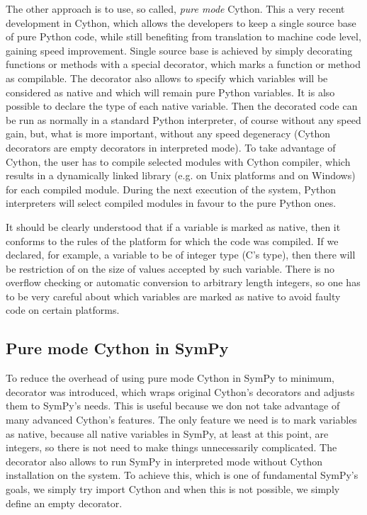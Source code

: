The other approach is to use, so called, \emph{pure mode} Cython. This a very recent development
in Cython, which allows the developers to keep a single source base of pure Python code, while
still benefiting from translation to machine code level, gaining speed improvement. Single source
base is achieved by simply decorating functions or methods with a special decorator, which marks
a function or method as compilable. The decorator also allows to specify which variables will be
considered as native and which will remain pure Python variables. It is also possible to declare
the type of each native variable. Then the decorated code can be run as normally in a standard
Python interpreter, of course without any speed gain, but, what is more important, without any
speed degeneracy (Cython decorators are empty decorators in interpreted mode). To take advantage
of Cython, the user has to compile selected modules with Cython compiler, which results in a
dynamically linked library (e.g.  on Unix platforms and  on Windows) for each
compiled module. During the next execution of the system, Python interpreters will select compiled
modules in favour to the pure Python ones.

It should be clearly understood that if a variable is marked as native, then it conforms to the
rules of the platform for which the code was compiled. If we declared, for example, a variable
to be of integer type (C's  type), then there will be restriction of on the size of values
accepted by such variable. There is no overflow checking or automatic conversion to arbitrary
length integers, so one has to be very careful about which variables are marked as native to
avoid faulty code on certain platforms.


\subsection{Pure mode Cython in SymPy}

To reduce the overhead of using pure mode Cython in SymPy to minimum,  decorator
was introduced, which wraps original Cython's decorators and adjusts them to SymPy's needs. This
is useful because we don not take advantage of many advanced Cython's features. The only feature
we need is to mark variables as native, because all native variables in SymPy, at least at this
point, are integers, so there is not need to make things unnecessarily complicated. The decorator
also allows to run SymPy in interpreted mode without Cython installation on the system. To achieve
this, which is one of fundamental SymPy's goals, we simply try import Cython and when this is not
possible, we simply define an empty decorator.

